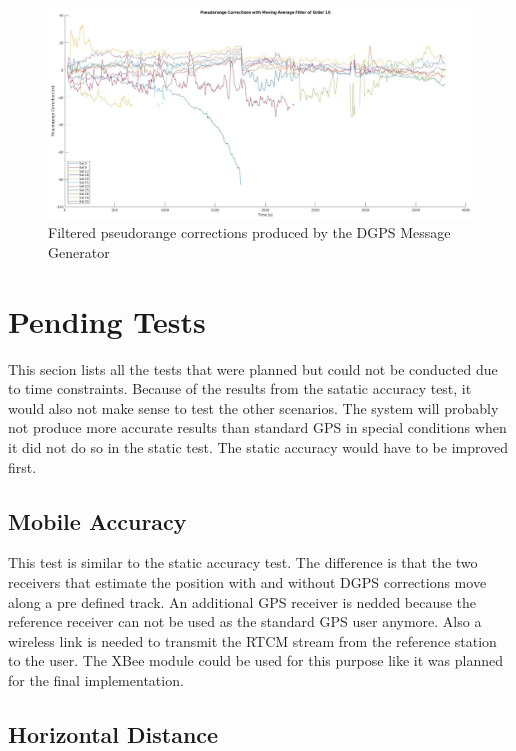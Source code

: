 \begin{figure}[!h]
 \centering
 \includegraphics[height=0.4\textheight]{images/PRCs_filtered.jpg}
 \caption{Filtered pseudorange corrections produced by the DGPS Message Generator}
 \label{fig:prcs_filtered}
\end{figure}

\section{Pending Tests}

This secion lists all the tests that were planned but could not be conducted due to time constraints.
Because of the results from the satatic accuracy test, it would also not make sense to test the other scenarios.
The system will probably not produce more accurate results than standard GPS in special conditions when it did not do so in the static test.
The static accuracy would have to be improved first.

\subsection{Mobile Accuracy}

This test is similar to the static accuracy test.
The difference is that the two receivers that estimate the position with and without DGPS corrections move along a pre defined track.
An additional GPS receiver is nedded because the reference receiver can not be used as the standard GPS user anymore.
Also a wireless link is needed to transmit the RTCM stream from the reference station to the user.
The XBee module could be used for this purpose like it was planned for the final implementation.

\subsection{Horizontal Distance}

